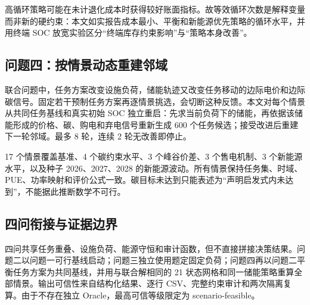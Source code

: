 高循环策略可能在未计退化成本时获得较好账面指标。故等效循环次数是解释变量而非新的硬约束：本文如实报告成本最小、平衡和新能源优先策略的循环水平，并用终端 SOC 放宽实验区分“终端库存约束影响”与“策略本身改善”。

\subsection{问题四：按情景动态重建邻域}
联合问题中，任务方案改变设施负荷，储能轨迹又改变任务移动的边际电价和边际碳信号。固定若干预制任务方案再逐情景挑选，会切断这种反馈。本文对每个情景从共同任务基线和真实初始 SOC 独立重启：先求当前负荷下的储能，再依据该储能形成的价格、碳、购电和弃电信号重新生成 600 个任务候选；接受改进后重建下一轮邻域。最多 8 轮，连续 2 轮无改善即停止。

17 个情景覆盖基准、4 个碳约束水平、3 个峰谷价差、3 个售电机制、3 个新能源水平，以及种子 2026、2027、2028 的新能源波动。所有情景保持任务集、时域、PUE、功率映射和评价公式一致。碳目标未达到只能表述为“声明启发式内未达到”，不能据此推断数学不可行。

\subsection{四问衔接与证据边界}
四问共享任务重叠、设施负荷、能源守恒和审计函数，但不直接拼接决策结果。问题二以问题一可行基线启动；问题三独立使用题定固定负荷；问题四再以问题二平衡任务方案为共同基线，并用与联合解相同的 21 状态网格和同一储能策略重算全部情景。输出可信性来自结构化结果、逐行 CSV、完整约束审计和两次隔离复算。由于不存在独立 Oracle，最高可信等级限定为 scenario-feasible。
